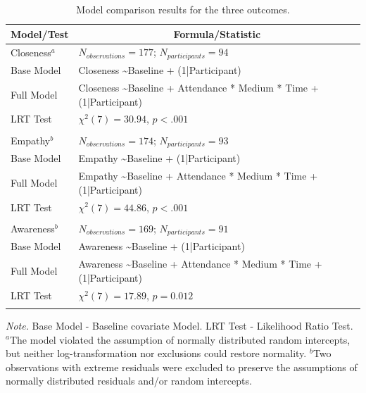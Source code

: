 \documentclass[
  man,floatsintext]{apa6}
\begin{document}
\begin{table}[tbp]

\begin{center}
\begin{threeparttable}

\caption{\label{tab:model-comp}Model comparison results for the three outcomes.}

\begin{tabular}{ll}
\toprule
Model/Test & \multicolumn{1}{c}{Formula/Statistic}\\
\midrule
Closeness$^a$ & $N_{observations} = 177$; $N_{participants} = 94$\\
Base Model & Closeness \textasciitilde Baseline + (1|Participant)\\
Full Model & Closeness \textasciitilde Baseline + Attendance * Medium * Time + (1|Participant)\\
LRT Test & $\chi^2 (7) = 30.94$, $p < .001$\\
 & \\
Empathy$^b$ & $N_{observations} = 174$; $N_{participants} = 93$\\
Base Model & Empathy \textasciitilde Baseline + (1|Participant)\\
Full Model & Empathy \textasciitilde Baseline + Attendance * Medium * Time + (1|Participant)\\
LRT Test & $\chi^2 (7) = 44.86$, $p < .001$\\
 & \\
Awareness$^b$ & $N_{observations} = 169$; $N_{participants} = 91$\\
Base Model & Awareness \textasciitilde Baseline + (1|Participant)\\
Full Model & Awareness \textasciitilde Baseline + Attendance * Medium * Time + (1|Participant)\\
LRT Test & $\chi^2 (7) = 17.89$, $p = 0.012$\\
\bottomrule
\addlinespace
\end{tabular}

\begin{tablenotes}[para]
\normalsize{\textit{Note.} Base Model - Baseline covariate Model. LRT Test - Likelihood Ratio Test. $^a$The model violated the assumption of normally distributed random intercepts, but neither log-transformation nor exclusions could restore normality. $^b$Two observations with extreme residuals were excluded to preserve the assumptions of normally distributed residuals and/or random intercepts.}
\end{tablenotes}

\end{threeparttable}
\end{center}

\end{table}
\end{document}
